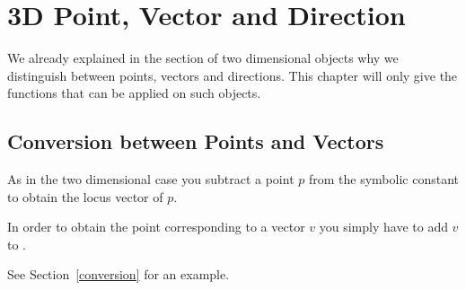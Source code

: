 
\cleardoublepage
\chapter{3D Point, Vector and Direction \label{PointVectorDirection3}}


We already explained in the section of two dimensional objects why we
distinguish between points, vectors and directions. This chapter will
only give the functions that can be applied on such objects.



\newpage


\newpage





\section{Conversion between Points and Vectors\label{conversion3d}}

As in the two dimensional case you subtract a point $p$ from the 
symbolic constant  to obtain the locus vector of $p$.

In order to obtain the point corresponding to a vector $v$ you simply
have to add $v$ to .


See Section~\ref{conversion} for an example.